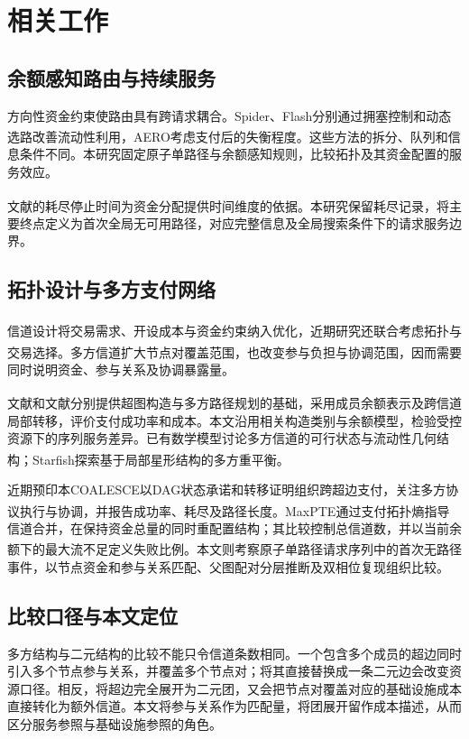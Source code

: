 \documentclass[UTF8,a4paper,twocolumn,fontset=none,zihao=5]{ctexart}
\newcommand{\upcite}[1]{\textsuperscript{\cite{#1}}}
\begin{document}
\section{相关工作}

\subsection{余额感知路由与持续服务}

方向性资金约束使路由具有跨请求耦合。Spider、Flash分别通过拥塞控制和动态选路改善流动性利用\upcite{r3,r4}，AERO考虑支付后的失衡程度\upcite{r12}。这些方法的拆分、队列和信息条件不同。本研究固定原子单路径与余额感知规则，比较拓扑及其资金配置的服务效应。


文献\upcite{r9}的耗尽停止时间为资金分配提供时间维度的依据。本研究保留耗尽记录，将主要终点定义为首次全局无可用路径，对应完整信息及全局搜索条件下的请求服务边界。


\subsection{拓扑设计与多方支付网络}

信道设计将交易需求、开设成本与资金约束纳入优化\upcite{r6,r7,r8}，近期研究还联合考虑拓扑与交易选择\upcite{r13}。多方信道扩大节点对覆盖范围，也改变参与负担与协调范围\upcite{r10}，因而需要同时说明资金、参与关系及协调暴露量。


文献\upcite{r10}和文献\upcite{r11}分别提供超图构造与多方路径规划的基础，采用成员余额表示及跨信道局部转移，评价支付成功率和成本。本文沿用相关构造类别与余额模型，检验受控资源下的序列服务差异。已有数学模型讨论多方信道的可行状态与流动性几何结构\upcite{r14}；Starfish探索基于局部星形结构的多方重平衡\upcite{r15}。

近期预印本COALESCE以DAG状态承诺和转移证明组织跨超边支付，关注多方协议执行与协调，并报告成功率、耗尽及路径长度\upcite{r16}。MaxPTE通过支付拓扑熵指导信道合并，在保持资金总量的同时重配置结构；其比较控制总信道数，并以当前余额下的最大流不足定义失败比例\upcite{r17}。本文则考察原子单路径请求序列中的首次无路径事件，以节点资金和参与关系匹配、父图配对分层推断及双相位复现组织比较。


\subsection{比较口径与本文定位}

多方结构与二元结构的比较不能只令信道条数相同。一个包含多个成员的超边同时引入多个节点参与关系，并覆盖多个节点对；将其直接替换成一条二元边会改变资源口径。相反，将超边完全展开为二元团，又会把节点对覆盖对应的基础设施成本直接转化为额外信道。本文将参与关系作为匹配量，将团展开留作成本描述，从而区分服务参照与基础设施参照的角色。
\end{document}
